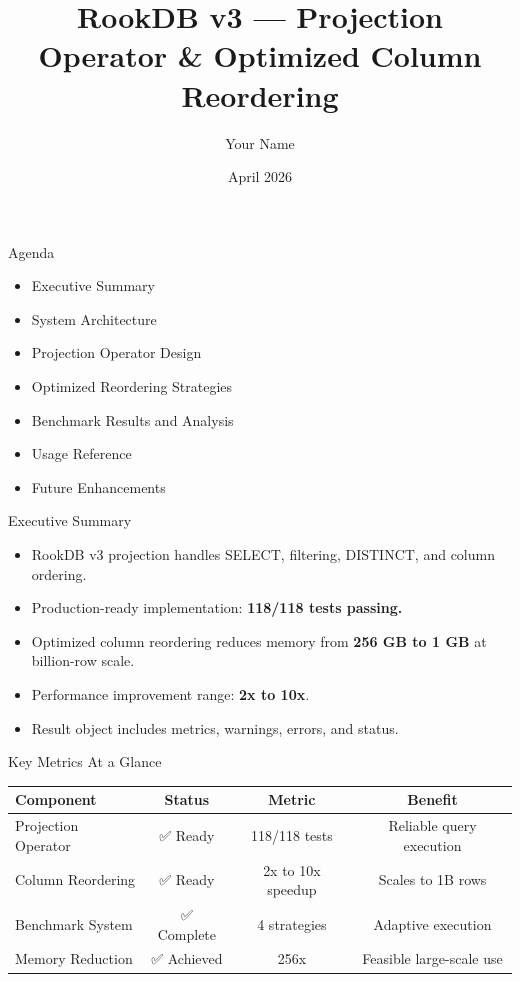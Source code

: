 \documentclass{beamer}
\title[RookDB v3 Projection]{RookDB v3 — Projection Operator \& Optimized Column Reordering}
\author{Your Name}
\institute{Course Work / Datasystems}
\date{April 2026}
\begin{document}
\begin{frame}
  \titlepage
\end{frame}

\begin{frame}{Agenda}
  \begin{itemize}
    \item Executive Summary
    \item System Architecture
    \item Projection Operator Design
    \item Optimized Reordering Strategies
    \item Benchmark Results and Analysis
    \item Usage Reference
    \item Future Enhancements
  \end{itemize}
\end{frame}

\begin{frame}{Executive Summary}
  \begin{itemize}
    \item RookDB v3 projection handles SELECT, filtering, DISTINCT, and column ordering.
    \item Production-ready implementation: \textbf{118/118 tests passing.}
    \item Optimized column reordering reduces memory from \textbf{256 GB to 1 GB} at billion-row scale.
    \item Performance improvement range: \textbf{2x to 10x}. 
    \item Result object includes metrics, warnings, errors, and status.
  \end{itemize}
\end{frame}

\begin{frame}{Key Metrics At a Glance}
  \begin{tabular}{lccc}
    \toprule
    \textbf{Component} & \textbf{Status} & \textbf{Metric} & \textbf{Benefit} \\
    \midrule
    Projection Operator & ✅ Ready & 118/118 tests & Reliable query execution \\
    Column Reordering & ✅ Ready & 2x to 10x speedup & Scales to 1B rows \\
    Benchmark System & ✅ Complete & 4 strategies & Adaptive execution \\
    Memory Reduction & ✅ Achieved & 256x & Feasible large-scale use \\
    \bottomrule
  \end{tabular}
\end{frame}
\end{document}
